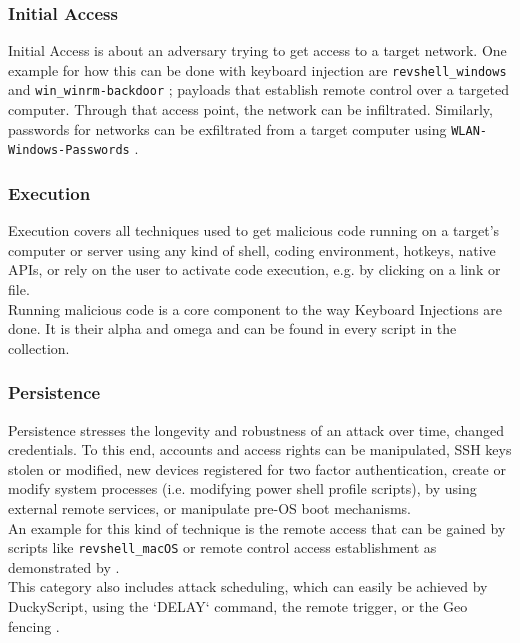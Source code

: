 \subsubsection{Initial Access}

Initial Access is about an adversary trying to get access to a target network\cite{MITREATTCK}. One example for how this can be done with keyboard injection are \verb|revshell_windows| and \verb|win_winrm-backdoor| \cite{OmgpayloadsPayloadsLibrary}; payloads that establish remote control over a targeted computer. Through that access point, the network can be infiltrated. Similarly, passwords for networks can be exfiltrated from a target computer using \verb|WLAN-Windows-Passwords| \cite{OmgpayloadsPayloadsLibrary}.\\

\subsubsection{Execution}

Execution covers all techniques used to get malicious code running on a target's computer or server using any kind of shell, coding environment, hotkeys, native APIs, or rely on the user to activate code execution, e.g. by clicking on a link or file.\cite{MITREATTCK}\\
Running malicious code is a core component to the way Keyboard Injections are done. It is their alpha and omega and can be found in every script in the collection.

\subsubsection{Persistence} \label{persistence}

Persistence stresses the longevity and robustness of an attack over time, changed credentials. To this end, accounts and access rights can be manipulated, SSH keys stolen or modified, new devices registered for two factor authentication, create or modify system processes (i.e. modifying power shell profile scripts), by using external remote services, or manipulate pre-OS boot mechanisms.\cite{MITREATTCK} \\
An example for this kind of technique is the remote access that can be gained by scripts like \verb|revshell_macOS| \cite{OmgpayloadsPayloadsLibrary} or remote control access establishment as demonstrated by \cite{bojovicRisingThreatHardware2019}. \\
This category also includes attack scheduling, which can easily be achieved by DuckyScript, using the `DELAY` command, the remote trigger, or the Geo fencing \cite{hak5MGCable}.

